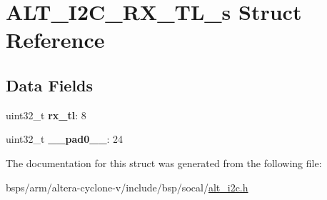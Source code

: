 \hypertarget{structALT__I2C__RX__TL__s}{}\section{A\+L\+T\+\_\+\+I2\+C\+\_\+\+R\+X\+\_\+\+T\+L\+\_\+s Struct Reference}
\label{structALT__I2C__RX__TL__s}
\subsection*{Data Fields}
\begin{DoxyCompactItemize}
\item 
\mbox{\label{structALT__I2C__RX__TL__s_a3258f6aef125b2d2d0d1ea0fee3076cd}} 
uint32\+\_\+t {\bfseries rx\+\_\+tl}\+: 8
\item 
\mbox{\label{structALT__I2C__RX__TL__s_a14cfb3790ee01205743ed157bdaedd2e}} 
uint32\+\_\+t {\bfseries \+\_\+\+\_\+pad0\+\_\+\+\_\+}\+: 24
\end{DoxyCompactItemize}


The documentation for this struct was generated from the following file\+:\begin{DoxyCompactItemize}
\item 
bsps/arm/altera-\/cyclone-\/v/include/bsp/socal/\mbox{\hyperlink{socal_2alt__i2c_8h}{alt\+\_\+i2c.\+h}}\end{DoxyCompactItemize}
